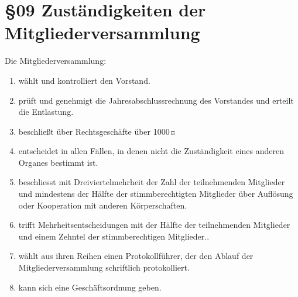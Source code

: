 \section*{§09 Zuständigkeiten der Mitgliederversammlung }

Die Mitgliederversammlung:
\begin{enumerate}
\item wählt und kontrolliert den Vorstand.
\item prüft und genehmigt die Jahresabschlussrechnung des Vorstandes und
erteilt die Entlastung.
\item beschließt über Rechtsgeschäfte über 1000¤
\item entscheidet in allen Fällen, in denen nicht die Zuständigkeit eines
anderen Organes bestimmt ist.
\item beschliesst mit Dreiviertelmehrheit der Zahl der teilnehmenden Mitglieder
und mindestens der Hälfte der stimmberechtigten Mitglieder über Auflösung
oder Kooperation mit anderen Körperschaften.
\item trifft Mehrheitsentscheidungen mit der Hälfte der teilnehmenden Mitglieder
und einem Zehntel der stimmberechtigen Mitglieder..
\item wählt aus ihren Reihen einen Protokollführer, der den Ablauf der Mitgliederversammlung
schriftlich protokolliert.
\item kann sich eine Geschäftsordnung geben.
\end{enumerate}